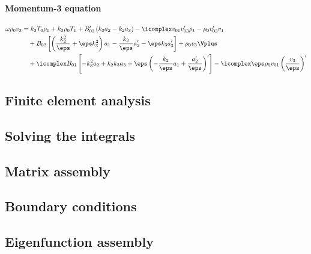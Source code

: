 \paragraph{Momentum-3 equation}
\begin{equation}
  \begin{aligned}
    \omega \rho_0 v_3 &=
      k_3 T_0 \rho_1
      + k_3 \rho_0 T_1
		  + B_{03}' \left(k_3 a_2  - k_2 a_3\right)
      - \icomplex v_{01} v_{03}' \rho_1
      - \rho_0 v_{03}'v_1 \\
      &\quad
		  + B_{02} \left[
        \left(\frac{k_2^2}{\eps} + \eps k_3^2\right)a_1  - \frac{k_2}{\eps}a_2'  - \eps k_3 a_3'
      \right]
      + \rho_0 v_3 \Vplus \\
		&\quad
    + \icomplex B_{01} \left[
      -k_3^2 a_2  + k_2 k_3 a_3  + \eps\left(- \frac{k_2}{\eps}a_1 + \frac{a_2'}{\eps}\right)'
    \right]
    - \icomplex \eps \rho_0 v_{01} \left(\frac{v_3}{\eps}\right)'
  \end{aligned}
\end{equation}


\subsection{Finite element analysis} \label{ss: finite_elements}
\subsection{Solving the integrals} \label{ss: solving_integrals}
\subsection{Matrix assembly}
\subsection{Boundary conditions}
\subsection{Eigenfunction assembly}


\cleardoublepage
